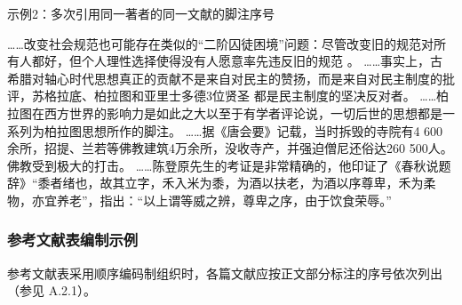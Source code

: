 \documentclass{article}
\begin{document}
\begin{refsection}
示例2：多次引用同一著者的同一文献的脚注序号

……改变社会规范也可能存在类似的“二阶囚徒困境”问题：尽管改变旧的规范对所有人都好，但个人理性选择使得没有人愿意率先违反旧的规范
。
……事实上，古希腊对轴心时代思想真正的贡献不是来自对民主的赞扬，而是来自对民主制度的批评，苏格拉底、柏拉图和亚里士多德3位贤圣
都是民主制度的坚决反对者。
……柏拉图在西方世界的影响力是如此之大以至于有学者评论说，一切后世的思想都是一系列为柏拉图思想所作的脚注。
……据《唐会要》记载，当时拆毁的寺院有4 600余所，招提、兰若等佛教建筑4万余所，没收寺产，并强迫僧尼还俗达260 500人。
佛教受到极大的打击。
……陈登原先生的考证是非常精确的，他印证了《春秋说题辞》“黍者绪也，故其立字，禾入米为黍，为酒以扶老，为酒以序尊卑，禾为柔物，亦宜养老”，指出：“以上谓等威之辨，尊卑之序，由于饮食荣辱。”
\end{refsection}

\subsubsection{参考文献表编制示例}

参考文献表采用顺序编码制组织时，各篇文献应按正文部分标注的序号依次列出（参见 A.2.1）。

\begin{refsection}

\nocite{Baker1995--,Chernik1982--,尼葛洛庞帝1996--,汪冰1997-16-16,杨宗英1996-24-29,Dowler1995-5-26}

\printbibliography[heading=subbibliography,title={示例}]
\end{refsection}
\end{document}
